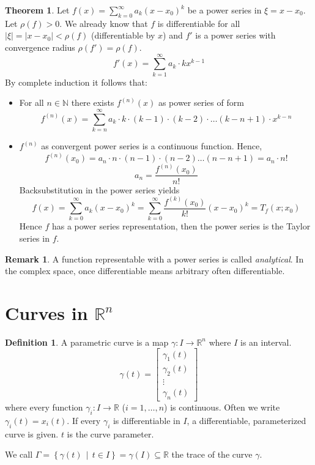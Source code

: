 \documentclass[a4paper,landscape,twocolumn]{article}
\theoremstyle{definition}
\newtheorem{theorem}{Theorem}
\newtheorem{defi}{Definition}
\newtheorem{rem}{Remark}
\newcommand\setdef[2]{\left\{#1\,\middle|\,#2\right\}}
\newcommand\abs[1]{\left|#1\right|}
\begin{document}
\begin{theorem}
  Let $f(x) = \sum_{k=0}^\infty a_k (x - x_0)^k$ be a power series in $\xi = x - x_0$.
  Let $\rho(f) > 0$. We already know that $f$ is differentiable for all $\abs{\xi} = \abs{x - x_0} < \rho(f)$ (differentiable by $x$) and $f'$ is a power series with convergence radius $\rho(f') = \rho(f)$.
  \[ f'(x) = \sum_{k=1}^\infty a_k \cdot k x^{k-1} \]
  By complete induction it follows that:
  \begin{itemize}
    \item For all $n \in \mathbb N$ there exists $f^{(n)}(x)$ as power series of form
      \[
        f^{(n)}(x)
        = \sum_{k=n}^\infty a_k \cdot k \cdot (k-1) \cdot (k-2)
          \cdot \ldots (k-n+1) \cdot x^{k-n}
      \]
    \item
      $f^{(n)}$ as convergent power series is a continuous function. Hence,
      \[ f^{(n)}(x_0) = a_n \cdot n \cdot (n-1) \cdot (n-2) \ldots (n-n+1) = a_n \cdot n! \]
      \[ a_n = \frac{f^{(n)}(x_0)}{n!} \]
      Backsubstitution in the power series yields
      \[
        f(x) = \sum_{k=0}^\infty a_k (x - x_0)^k
          = \sum_{k=0}^\infty \frac{f^{(k)}(x_0)}{k!} (x - x_0)^k
          = T_f(x; x_0)
      \]
      Hence $f$ has a power series representation, then the power series is the Taylor series in $f$.
  \end{itemize}
\end{theorem}

\begin{rem}
  A function representable with a power series is called \emph{analytical}.
  In the complex space, once differentiable means arbitrary often differentiable.
\end{rem}

\section{Curves in $\mathbb R^n$}
%
\begin{defi}
  A parametric curve is a map $\gamma: I \to \mathbb R^n$ where $I$ is an interval.
  \[
    \gamma(t) = \begin{bmatrix}
      \gamma_1(t) \\
      \gamma_2(t) \\
      \vdots \\
      \gamma_n(t)
    \end{bmatrix}
  \]
  where every function $\gamma_i: I \to \mathbb R$ ($i = 1, \ldots, n$) is continuous.
  Often we write $\gamma_i(t) = x_i(t)$.
  If every $\gamma_i$ is differentiable in $I$, a differentiable, parameterized curve
  is given. $t$ is the curve parameter.

  We call $\Gamma = \setdef{\gamma(t)}{t \in I} = \gamma(I) \subseteq \mathbb R$
  the trace of the curve $\gamma$.
\end{defi}
\end{document}
